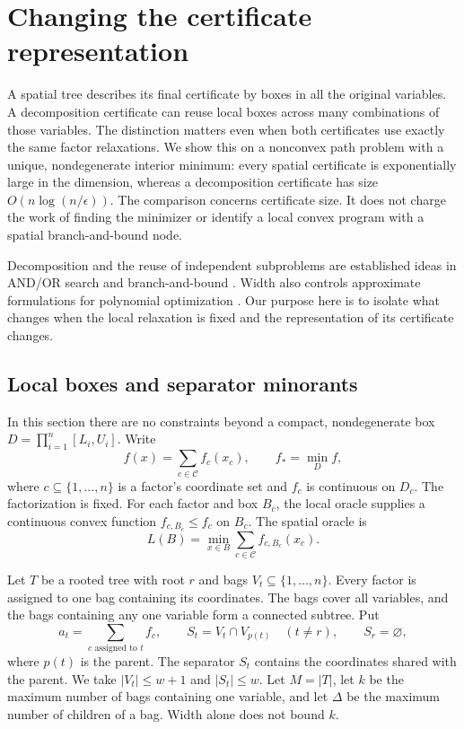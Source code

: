 \section{Changing the certificate representation}
\label{sec:decomposition}

A spatial tree describes its final certificate by boxes in all the original
variables. A decomposition certificate can reuse local boxes across many
combinations of those variables. The distinction matters even when both
certificates use exactly the same factor relaxations. We show this on a
nonconvex path problem with a unique, nondegenerate interior minimum: every
spatial certificate is exponentially large in the dimension, whereas a
decomposition certificate has size $O(n\log(n/\epsilon))$.
The comparison concerns certificate size. It does not charge the work of
finding the minimizer or identify a local convex program with a spatial
branch-and-bound node.

Decomposition and the reuse of independent subproblems are established
ideas in AND/OR search and branch-and-bound
\citep{marinescuDechter2009AndOrBranchAndBound}.
Width also controls approximate formulations for polynomial optimization
\citep{bienstockMunoz2018LpFormulations}.
Our purpose here is to isolate what changes when the local relaxation is
fixed and the representation of its certificate changes.

\subsection{Local boxes and separator minorants}

In this section there are no constraints beyond a compact, nondegenerate
box $D=\prod_{i=1}^n[L_i,U_i]$. Write
\begin{equation}\label{decomp:factorization}
 f(x)=\sum_{c\in\mathcal C}f_c(x_c),\qquad
 f_* =\min_D f,
\end{equation}
where $c\subseteq\{1,\ldots,n\}$ is a factor's coordinate set and
$f_c$ is continuous on $D_c$. The
factorization is fixed. For each factor and box $B_c$, the local oracle
supplies a continuous convex function $f_{c,B_c}\le f_c$ on $B_c$.
The spatial oracle is
\begin{equation}\label{decomp:spatial-oracle}
 L(B)=\min_{x\in B}\sum_{c\in\mathcal C}f_{c,B_c}(x_c).
\end{equation}

Let $T$ be a rooted tree with root $r$ and bags $V_t\subseteq\{1,\ldots,n\}$.
Every factor is assigned to one bag containing its coordinates. The bags
cover all variables, and the bags containing any one variable form a
connected subtree. Put
\[
 a_t=\sum_{c\text{ assigned to }t}f_c,\qquad
 S_t=V_t\cap V_{p(t)}\quad(t\ne r),\qquad S_r=\varnothing,
\]
where $p(t)$ is the parent. The separator $S_t$ contains the coordinates
shared with the parent. We take $|V_t|\le w+1$ and $|S_t|\le w$.
Let $M=|T|$, let $k$ be the maximum number of bags containing one variable,
and let $\Delta$ be the maximum number of children of a bag. Width alone
does not bound $k$.


